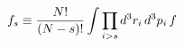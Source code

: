 \documentclass[preview]{standalone}
\begin{document}
\begin{align*}
\special{dvisvgm:raw <g id='unique000'>}f_s\equiv\frac{N!}{(N-s)!}\int\prod_{i>s}d^3r_i\,d^3p_i\,f\special{dvisvgm:raw </g>}
\end{align*}
\end{document}
